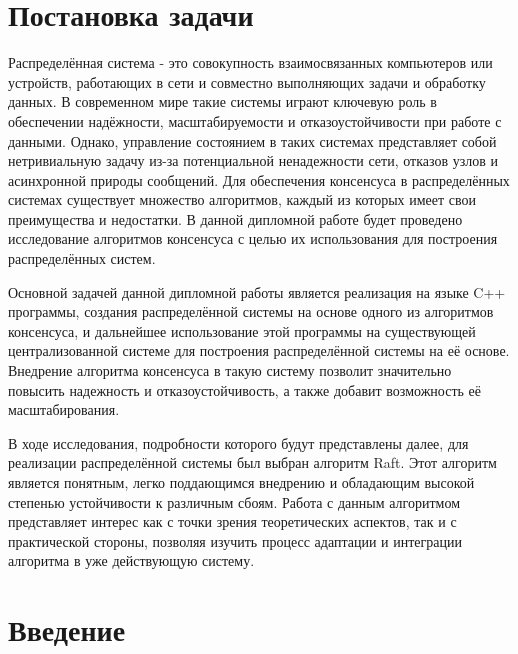 \documentclass[subf, href, colorlinks=true, 14pt,
times, mtpro, specialist]{disser}
\theoremstyle{definition}
\begin{document}
	
	\setcounter{tocdepth}{2}
	
	\tableofcontents
	\pagebreak



\section{Постановка задачи}

Распределённая система - это совокупность взаимосвязанных компьютеров или устройств, работающих в сети и совместно выполняющих задачи и обработку данных. В современном мире такие системы играют ключевую роль в обеспечении надёжности, масштабируемости и отказоустойчивости при работе с данными. Однако, управление состоянием в таких системах представляет собой нетривиальную задачу из-за потенциальной ненадежности сети, отказов узлов и асинхронной природы сообщений. Для обеспечения консенсуса в распределённых системах существует множество алгоритмов, каждый из которых имеет свои преимущества и недостатки. В данной дипломной работе будет проведено исследование алгоритмов консенсуса с целью их использования для построения распределённых систем.

Основной задачей данной дипломной работы является реализация на языке C++ программы, создания распределённой системы на основе одного из алгоритмов консенсуса, и дальнейшее использование этой программы на существующей централизованной системе для построения распределённой системы на её основе.
Внедрение алгоритма консенсуса в такую систему позволит значительно повысить надежность и отказоустойчивость, а также добавит возможность её масштабирования. 

В ходе исследования, подробности которого будут представлены далее, для реализации распределённой системы был выбран алгоритм Raft. Этот алгоритм является понятным, легко поддающимся внедрению и обладающим высокой степенью устойчивости к различным сбоям. Работа с данным алгоритмом представляет интерес как с точки зрения теоретических аспектов, так и с практической стороны, позволяя изучить процесс адаптации и интеграции алгоритма в уже действующую систему.

\section{Введение}
\end{document}
